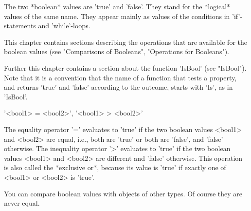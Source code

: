 %

The two *boolean*   values are 'true' and  'false'.   They stand for  the
*logical* values  of the same name.  They  appear mainly as values of the
conditions in 'if'-statements and 'while'-loops.

This  chapter contains  sections   describing  the operations  that   are
available   for  the  boolean  values   (see   "Comparisons of Booleans",
"Operations for Booleans").

Further this chapter contains a section  about the function 'IsBool' (see
"IsBool").  Note that it is a convention that the name of a function that
tests a   property, and  returns  'true' and   'false'  according to  the
outcome, starts with 'Is', as in 'IsBool'.

%

'<bool1> = <bool2>', '<bool1> \<> <bool2>'

The equality  operator '=' evaluates to  'true' if the two boolean values
<bool1> and <bool2> are equal, i.e., both are 'true' or both are 'false',
and 'false' otherwise.  The inequality operator '\<>' evaluates to 'true'
if the two boolean  values <bool1> and  <bool2> are different and 'false'
otherwise.  This operation is also called the *exclusive or*, because its
value is 'true' if exactly one of <bool1> or <bool2> is 'true'.

You  can compare boolean  values with objects  of other types.  Of course
they are never equal.

